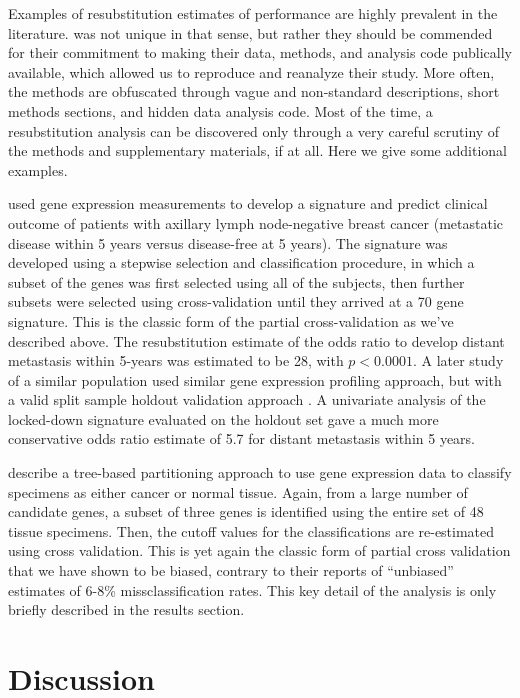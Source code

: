 \documentclass[12pt,]{article}
\begin{document}
Examples of resubstitution estimates of performance are highly prevalent
in the literature. \citet{zhu2010prognostic} was not unique in that
sense, but rather they should be commended for their commitment to
making their data, methods, and analysis code publically available,
which allowed us to reproduce and reanalyze their study. More often, the
methods are obfuscated through vague and non-standard descriptions,
short methods sections, and hidden data analysis code. Most of the time,
a resubstitution analysis can be discovered only through a very careful
scrutiny of the methods and supplementary materials, if at all. Here we
give some additional examples.

\citet{van2002gene} used gene expression measurements to develop a
signature and predict clinical outcome of patients with axillary lymph
node-negative breast cancer (metastatic disease within 5 years versus
disease-free at 5 years). The signature was developed using a stepwise
selection and classification procedure, in which a subset of the genes
was first selected using all of the subjects, then further subsets were
selected using cross-validation until they arrived at a 70 gene
signature. This is the classic form of the partial cross-validation as
we've described above. The resubstitution estimate of the odds ratio to
develop distant metastasis within 5-years was estimated to be 28, with
\(p < 0.0001\). A later study of a similar population used similar gene
expression profiling approach, but with a valid split sample holdout
validation approach \citep{wang2005gene}. A univariate analysis of the
locked-down signature evaluated on the holdout set gave a much more
conservative odds ratio estimate of 5.7 for distant metastasis within 5
years.

\citet{zhang2001recursive} describe a tree-based partitioning approach
to use gene expression data to classify specimens as either cancer or
normal tissue. Again, from a large number of candidate genes, a subset
of three genes is identified using the entire set of 48 tissue
specimens. Then, the cutoff values for the classifications are
re-estimated using cross validation. This is yet again the classic form
of partial cross validation that we have shown to be biased, contrary to
their reports of ``unbiased'' estimates of 6-8\% missclassification
rates. This key detail of the analysis is only briefly described in the
results section.

\section{Discussion}\label{discussion}
\end{document}
